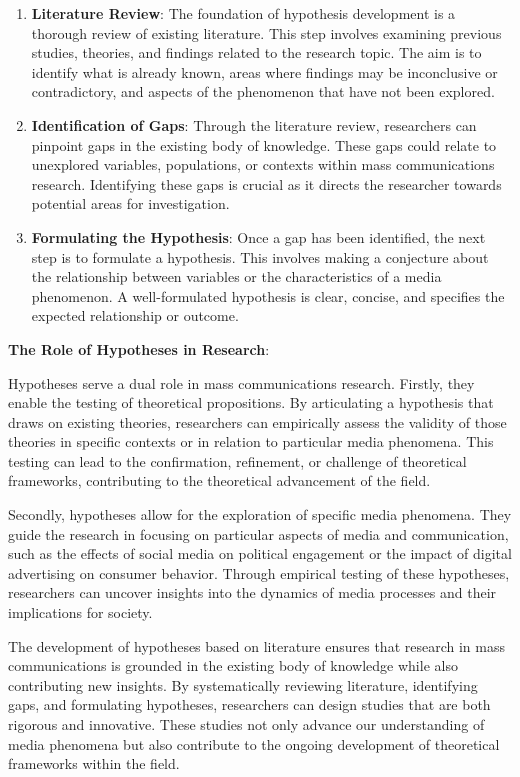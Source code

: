 \documentclass[
]{book}
\begin{document}
\begin{enumerate}
\def\labelenumi{\arabic{enumi}.}
\item
  \textbf{Literature Review}: The foundation of hypothesis development is a thorough review of existing literature. This step involves examining previous studies, theories, and findings related to the research topic. The aim is to identify what is already known, areas where findings may be inconclusive or contradictory, and aspects of the phenomenon that have not been explored.
\item
  \textbf{Identification of Gaps}: Through the literature review, researchers can pinpoint gaps in the existing body of knowledge. These gaps could relate to unexplored variables, populations, or contexts within mass communications research. Identifying these gaps is crucial as it directs the researcher towards potential areas for investigation.
\item
  \textbf{Formulating the Hypothesis}: Once a gap has been identified, the next step is to formulate a hypothesis. This involves making a conjecture about the relationship between variables or the characteristics of a media phenomenon. A well-formulated hypothesis is clear, concise, and specifies the expected relationship or outcome.
\end{enumerate}

\textbf{The Role of Hypotheses in Research}:

Hypotheses serve a dual role in mass communications research. Firstly, they enable the testing of theoretical propositions. By articulating a hypothesis that draws on existing theories, researchers can empirically assess the validity of those theories in specific contexts or in relation to particular media phenomena. This testing can lead to the confirmation, refinement, or challenge of theoretical frameworks, contributing to the theoretical advancement of the field.

Secondly, hypotheses allow for the exploration of specific media phenomena. They guide the research in focusing on particular aspects of media and communication, such as the effects of social media on political engagement or the impact of digital advertising on consumer behavior. Through empirical testing of these hypotheses, researchers can uncover insights into the dynamics of media processes and their implications for society.

The development of hypotheses based on literature ensures that research in mass communications is grounded in the existing body of knowledge while also contributing new insights. By systematically reviewing literature, identifying gaps, and formulating hypotheses, researchers can design studies that are both rigorous and innovative. These studies not only advance our understanding of media phenomena but also contribute to the ongoing development of theoretical frameworks within the field.
\end{document}
